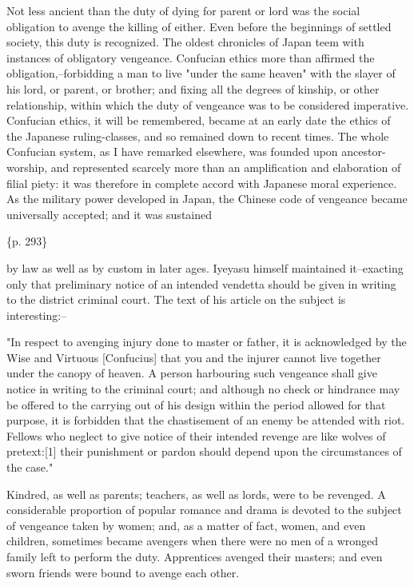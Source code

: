 Not less ancient than the duty of dying for parent or lord was the social obligation to avenge the killing of either. Even before the beginnings of settled society, this duty is recognized. The oldest chronicles of Japan teem with instances of obligatory vengeance. Confucian ethics more than affirmed the obligation,--forbidding a man to live "under the same heaven" with the slayer of his lord, or parent, or brother; and fixing all the degrees of kinship, or other relationship, within which the duty of vengeance was to be considered imperative. Confucian ethics, it will be remembered, became at an early date the ethics of the Japanese ruling-classes, and so remained down to recent times. The whole Confucian system, as I have remarked elsewhere, was founded upon ancestor-worship, and represented scarcely more than an amplification and elaboration of filial piety: it was therefore in complete accord with Japanese moral experience. As the military power developed in Japan, the Chinese code of vengeance became universally accepted; and it was sustained

\{p. 293\}

by law as well as by custom in later ages. Iyeyasu himself maintained it--exacting only that preliminary notice of an intended vendetta should be given in writing to the district criminal court. The text of his article on the subject is interesting:--

"In respect to avenging injury done to master or father, it is acknowledged by the Wise and Virtuous [Confucius] that you and the injurer cannot live together under the canopy of heaven. A person harbouring such vengeance shall give notice in writing to the criminal court; and although no check or hindrance may be offered to the carrying out of his design within the period allowed for that purpose, it is forbidden that the chastisement of an enemy be attended with riot. Fellows who neglect to give notice of their intended revenge are like wolves of pretext:[1] their punishment or pardon should depend upon the circumstances of the case."

Kindred, as well as parents; teachers, as well as lords, were to be revenged. A considerable proportion of popular romance and drama is devoted to the subject of vengeance taken by women; and, as a matter of fact, women, and even children, sometimes became avengers when there were no men of a wronged family left to perform the duty. Apprentices avenged their masters; and even sworn friends were bound to avenge each other.

